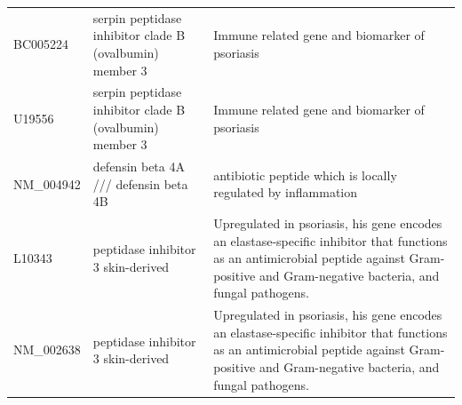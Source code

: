 \documentclass[10pt,a4paper]{article}
\begin{document}
\begin{table}[]
\begin{tabular}{l|p{5cm} p{8cm}}
			BC005224           & serpin peptidase inhibitor  clade B (ovalbumin) member 3                                                                & Immune related gene and biomarker of psoriasis\cite{lowes2008psoriasis, jiang2015biomarkers}                                                                                                                                                                                              \\
			U19556             & serpin peptidase inhibitor clade B (ovalbumin) member 3                                                                 & Immune related gene and biomarker of psoriasis\cite{lowes2008psoriasis, jiang2015biomarkers}                                                                                                                                                                                                                                          \\
			NM\_004942         & defensin  beta 4A /// defensin beta 4B                                                                                  & antibiotic peptide which is locally regulated by inflammation\cite{jansen2009beta}                                                                                                                                                                             \\
			L10343             & peptidase inhibitor 3  skin-derived                                                                                     & Upregulated in psoriasis, his gene encodes an elastase-specific inhibitor that functions as an antimicrobial peptide against Gram-positive and Gram-negative bacteria, and fungal pathogens.\cite{gudjonsson2010assessment, roesner2017inflammatory}                                              \\
			NM\_002638 &  peptidase inhibitor 3  skin-derived                                                                                           & Upregulated in psoriasis, his gene encodes an elastase-specific inhibitor that functions as an antimicrobial peptide against Gram-positive and Gram-negative bacteria, and fungal pathogens.\cite{gudjonsson2010assessment, roesner2017inflammatory}                                                                                        \\ \hline                                                                                                                                                                                                                                         
		\end{tabular}
	\end{table}
	
\end{document}

